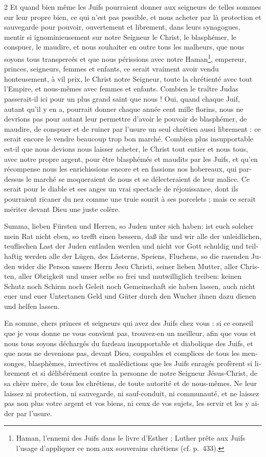 \documentclass[a4paper,12pt]{article}
\newcommand\chunks[2]{%
\begin{leftcolumn*}\begin{otherlanguage}{german}%
{#1}%
\end{otherlanguage}\end{leftcolumn*}%
\begin{rightcolumn}\begin{otherlanguage}{french}%
{#2}%
\end{otherlanguage}\end{rightcolumn}%
}
\begin{document}
\begin{paracol}{2}
         {Et quand bien même les Juifs pourraient donner aux seigneurs de telles sommes sur leur propre bien, ce qui n’est pas possible, et nous acheter par là protection et sauvegarde pour pouvoir, ouvertement et librement, dans leurs synagogues, mentir si ignominieusement sur notre Seigneur le Christ, le blasphémer, le conspuer, le maudire, et nous souhaiter en outre tous les malheurs, que nous soyons tous transpercés et que nous périssions avec notre Haman\footnote{Haman, l’ennemi des Juifs dans le livre d’Esther ; Luther prête aux Juifs l’usage d’appliquer ce nom aux souverains chrétiens (cf. p.~433).}, empereur, princes, seigneurs, femmes et enfants, ce serait vraiment avoir vendu honteusement, à vil prix, le Christ notre Seigneur, toute la chrétienté avec tout l’Empire, et nous-mêmes avec femmes et enfants. Combien le traître Judas passerait-il ici pour un plus grand saint que nous ! Oui, quand chaque Juif, autant qu’il y en a, pourrait donner chaque année cent mille florins, nous ne devrions pas pour autant leur permettre d’avoir le pouvoir de blasphémer, de maudire, de conspuer et de ruiner par l’usure un seul chrétien aussi librement : ce serait encore le vendre beaucoup trop bon marché. Combien plus insupportable est-il que nous devions nous laisser acheter, le Christ tout entier et nous tous, avec notre propre argent, pour être blasphémés et maudits par les Juifs, et qu’en récompense nous les enrichissions encore et en fassions nos hobereaux, qui par-dessus le marché se moqueraient de nous et se délecteraient de leur malice. Ce serait pour le diable et ses anges un vrai spectacle de réjouissance, dont ils pourraient ricaner du nez comme une truie sourit à ses porcelets ; mais ce serait mériter devant Dieu une juste colère.}
  \chunks{Summa, lieben Fürsten und Herren, so Juden unter sich haben: ist euch solcher mein Rat nicht eben, so trefft einen bessern, daß ihr und wir alle der unleidlichen, teuflischen Last der Juden entladen werden und nicht vor Gott schuldig und teilhaftig werden alle der Lügen, des Lästerns, Speiens, Fluchens, so die rasenden Juden wider die Person unsers Herrn Jesu Christi, seiner lieben Mutter, aller Christen, aller Obrigkeit und unser selbs so frei und mutwilliglich treiben: keinen Schutz noch Schirm noch Geleit noch Gemeinschaft sie haben lassen, auch nicht euer und euer Untertanen Geld und Güter durch den Wucher ihnen dazu dienen und helfen lassen.}
         {En somme, chers princes et seigneurs qui avez des Juifs chez vous : si ce conseil que je vous donne ne vous convient pas, trouvez-en un meilleur, afin que vous et nous tous soyons déchargés du fardeau insupportable et diabolique des Juifs, et que nous ne devenions pas, devant Dieu, coupables et complices de tous les mensonges, blasphèmes, invectives et malédictions que les Juifs enragés profèrent si librement et si délibérément contre la personne de notre Seigneur Jésus-Christ, de sa chère mère, de tous les chrétiens, de toute autorité et de nous-mêmes. Ne leur laissez ni protection, ni sauvegarde, ni sauf-conduit, ni communauté, et ne laissez pas non plus votre argent et vos biens, ni ceux de vos sujets, les servir et les y aider par l’usure.}

\end{paracol}
\end{document}
